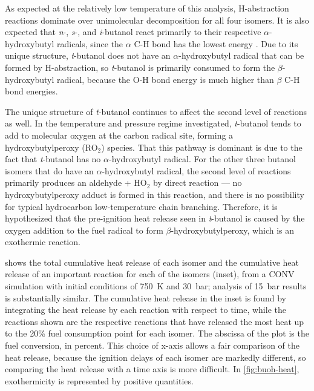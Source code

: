 \documentclass[12pt, letterpaper]{article}
\begin{document}
As expected at the relatively low temperature of this analysis, H-abstraction
reactions dominate over unimolecular decomposition for all four isomers. It is
also expected that \textit{n}-, \textit{s}-, and \textit{i}-butanol react
primarily to their respective $\alpha$-hydroxybutyl radicals, since the
$\alpha$ C-H bond has the lowest energy \cite{Sarathy2012}. Due to its unique
structure, \textit{t}-butanol does not have an $\alpha$-hydroxybutyl radical
that can be formed by H-abstraction, so \textit{t}-butanol is primarily
consumed to form the $\beta$-hydroxybutyl radical, because the O-H bond energy
is much higher than $\beta$ C-H bond energies.

The unique structure of \textit{t}-butanol continues to affect the second level
of reactions as well. In the temperature and pressure regime investigated,
\textit{t}-butanol tends to add to molecular oxygen at the carbon radical site,
forming a hydroxybutylperoxy (RO$_2$) species. That this pathway is dominant is
due to the fact that \textit{t}-butanol has no $\alpha$-hydroxybutyl radical.
For the other three butanol isomers that do have an $\alpha$-hydroxybutyl
radical, the second level of reactions primarily produces an aldehyde + HO$_2$
by direct reaction –-- no hydroxybutylperoxy adduct is formed in this reaction,
and there is no possibility for typical hydrocarbon low-temperature chain
branching. Therefore, it is hypothesized that the pre-ignition heat release
seen in \textit{t}-butanol is caused by the oxygen addition to the fuel radical
to form $\beta$-hydroxybutylperoxy, which is an exothermic reaction.

 shows the total cumulative heat release of each isomer
and the cumulative heat release of an important reaction for each of the
isomers (inset), from a CONV simulation with initial conditions of \SI{750}{\kelvin} and
\SI{30}{\bar}; analysis of \SI{15}{\bar} results is substantially similar. The cumulative heat
release in the inset is found by integrating the heat release by each reaction
with respect to time, while the reactions shown are the respective reactions
that have released the most heat up to the 20\% fuel consumption point for each
isomer. The abscissa of the plot is the fuel conversion, in percent. This
choice of x-axis allows a fair comparison of the heat release, because the
ignition delays of each isomer are markedly different, so comparing the heat
release with a time axis is more difficult. In \autoref{fig:buoh-heat},
exothermicity is represented by positive quantities.
\end{document}
